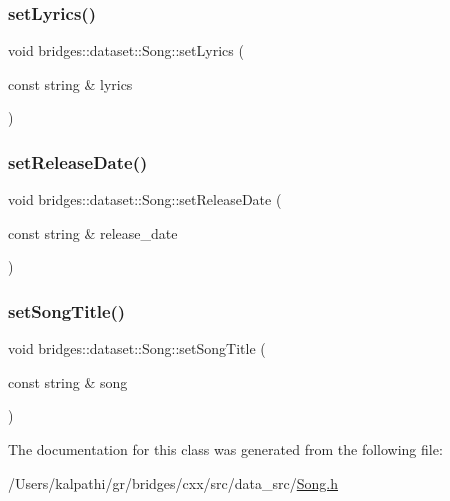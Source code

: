 \mbox{\label{classbridges_1_1dataset_1_1_song_a1ec794f19e791366b9af9df132d4a4b5}} 
\subsubsection{\texorpdfstring{setLyrics()}{setLyrics()}}
{\footnotesize\ttfamily void bridges\+::dataset\+::\+Song\+::set\+Lyrics (\begin{DoxyParamCaption}\item[{const string \&}]{lyrics }\end{DoxyParamCaption})\hspace{0.3cm}{\ttfamily [inline]}}

\mbox{\label{classbridges_1_1dataset_1_1_song_ab40e43ae94ffc57d2f036769d807a144}} 
\subsubsection{\texorpdfstring{setReleaseDate()}{setReleaseDate()}}
{\footnotesize\ttfamily void bridges\+::dataset\+::\+Song\+::set\+Release\+Date (\begin{DoxyParamCaption}\item[{const string \&}]{release\+\_\+date }\end{DoxyParamCaption})\hspace{0.3cm}{\ttfamily [inline]}}

\mbox{\label{classbridges_1_1dataset_1_1_song_aa707a5a8905585643893b6c71bf5e299}} 
\subsubsection{\texorpdfstring{setSongTitle()}{setSongTitle()}}
{\footnotesize\ttfamily void bridges\+::dataset\+::\+Song\+::set\+Song\+Title (\begin{DoxyParamCaption}\item[{const string \&}]{song }\end{DoxyParamCaption})\hspace{0.3cm}{\ttfamily [inline]}}



The documentation for this class was generated from the following file\+:\begin{DoxyCompactItemize}
\item 
/\+Users/kalpathi/gr/bridges/cxx/src/data\+\_\+src/\mbox{\hyperlink{_song_8h}{Song.\+h}}\end{DoxyCompactItemize}
